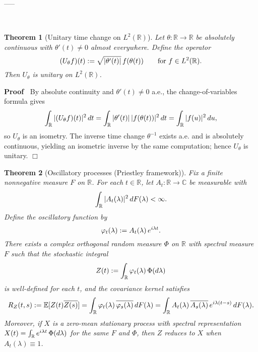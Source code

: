 \documentclass{article}
\newcommand{\assign}{:=}
\newenvironment{proof}{\noindent\textbf{Proof\ }}{\hspace*{\fill}$\Box$\medskip}
\newtheorem{theorem}{Theorem}
\begin{document}
-----\hrulefill

\

\begin{theorem}
  [Unitary time change on $L^2 (\mathbb{R})$] Let $\theta : \mathbb{R} \to
  \mathbb{R}$ be absolutely continuous with $\theta' (t) \neq 0$ almost
  everywhere. Define the operator
  \[ (U_{\theta} f) (t) \assign \sqrt{| \theta' (t) |}  \hspace{0.17em} f
     (\theta (t))  \qquad \text{for } f \in L^2 (\mathbb{R}) . \]
  Then $U_{\theta}$ is unitary on $L^2 (\mathbb{R})$.
\end{theorem}

\begin{proof}
  By absolute continuity and $\theta' (t) \neq 0$ a.e., the
  change-of-variables formula gives
  \[ \int_{\mathbb{R}} | (U_{\theta} f) (t) |^2 \hspace{0.17em} dt =
     \int_{\mathbb{R}} | \theta' (t) | \hspace{0.17em} |f (\theta (t)) |^2
     \hspace{0.17em} dt = \int_{\mathbb{R}} |f (u) |^2  \hspace{0.17em} du, \]
  so $U_{\theta}$ is an isometry. The inverse time change $\theta^{- 1}$
  exists a.e. and is absolutely continuous, yielding an isometric inverse by
  the same computation; hence $U_{\theta}$ is unitary.
\end{proof}

\begin{theorem}
  [Oscillatory processes (Priestley framework)] Fix a finite nonnegative
  measure $F$ on $\mathbb{R}$. For each $t \in \mathbb{R}$, let $A_t :
  \mathbb{R} \to \mathbb{C}$ be measurable with
  \[ \int_{\mathbb{R}} |A_t (\lambda) |^2  \hspace{0.17em} dF (\lambda) <
     \infty . \]
  Define the oscillatory function by
  \[ \varphi_t (\lambda) \assign A_t (\lambda)  \hspace{0.17em} e^{i \lambda
     t} . \]
  There exists a complex orthogonal random measure $\Phi$ on $\mathbb{R}$ with
  spectral measure $F$ such that the stochastic integral
  \[ Z (t) \assign \int_{\mathbb{R}} \varphi_t (\lambda)  \hspace{0.17em} \Phi
     (d \lambda) \]
  is well-defined for each $t$, and the covariance kernel satisfies
  \[ R_Z (t, s) \assign \mathbb{E} [Z (t) \overline{Z (s)}] =
     \int_{\mathbb{R}} \varphi_t (\lambda) \hspace{0.17em} \overline{\varphi_s
     (\lambda)} \hspace{0.17em} dF (\lambda) = \int_{\mathbb{R}} A_t (\lambda)
     \hspace{0.17em} \overline{A_s (\lambda)} \hspace{0.17em} e^{i \lambda (t
     - s)}  \hspace{0.17em} dF (\lambda) . \]
  Moreover, if $X$ is a zero-mean stationary process with spectral
  representation $X (t) = \int_{\mathbb{R}} e^{i \lambda t}  \hspace{0.17em}
  \Phi (d \lambda)$ for the same $F$ and $\Phi$, then $Z$ reduces to $X$ when
  $A_t (\lambda) \equiv 1$.
\end{theorem}
\end{document}
